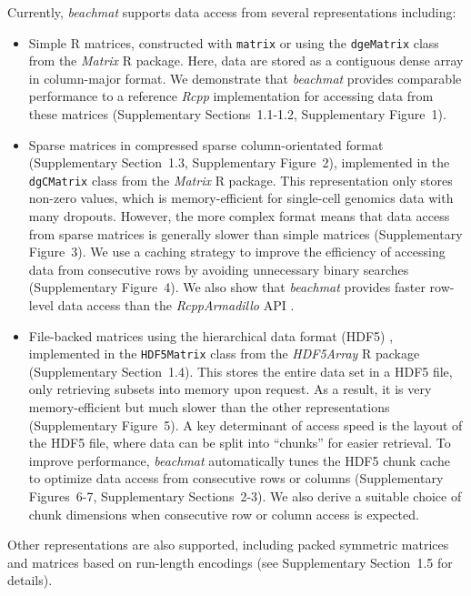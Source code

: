 \documentclass[10pt,letterpaper]{article}
\newcommand{\suppfigsimpleaccess}{1}
\newcommand{\suppfigsparseschem}{2}
\newcommand{\suppfigsparsecol}{3}
\newcommand{\suppfigsparserow}{4}
\newcommand{\suppfighdfspeed}{5}
\newcommand{\suppfighdflayout}{6-7}
\newcommand{\suppsecsimple}{1.1-1.2}
\newcommand{\suppsecsparse}{1.3}
\newcommand{\suppsechdfmat}{1.4}
\newcommand{\suppsecother}{1.5}
\newcommand{\suppseclayoutoptim}{2}
\newcommand{\suppseclayouttest}{3}
\newcommand{\beachmat}{\textit{beachmat}}
\begin{document}
Currently, \beachmat{} supports data access from several representations including:
\begin{itemize}
    \item Simple R matrices, constructed with \texttt{matrix} or using the \texttt{dgeMatrix} class from the \textit{Matrix} R package.
        Here, data are stored as a contiguous dense array in column-major format.
        We demonstrate that \beachmat{} provides comparable performance to a reference \textit{Rcpp} implementation for accessing data from these matrices 
        (Supplementary Sections~\suppsecsimple{}, Supplementary Figure~\suppfigsimpleaccess{}). 
    \item Sparse matrices in compressed sparse column-orientated format (Supplementary Section~\suppsecsparse{}, Supplementary Figure~\suppfigsparseschem{}), 
        implemented in the \texttt{dgCMatrix} class from the \textit{Matrix} R package.
        This representation only stores non-zero values, which is memory-efficient for single-cell genomics data with many dropouts.
        However, the more complex format means that data access from sparse matrices is generally slower than simple matrices (Supplementary Figure~\suppfigsparsecol{}).
        We use a caching strategy to improve the efficiency of accessing data from consecutive rows by avoiding unnecessary binary searches (Supplementary Figure~\suppfigsparserow{}).
        We also show that \beachmat{} provides faster row-level data access than the \textit{RcppArmadillo} API \cite{eddelbuettel2014arma}.
    \item File-backed matrices using the hierarchical data format (HDF5) \cite{hdf5}, 
        implemented in the \texttt{HDF5Matrix} class from the \textit{HDF5Array} R package (Supplementary Section~\suppsechdfmat{}).
        This stores the entire data set in a HDF5 file, only retrieving subsets into memory upon request.
        As a result, it is very memory-efficient but much slower than the other representations (Supplementary Figure~\suppfighdfspeed{}).
        A key determinant of access speed is the layout of the HDF5 file, where data can be split into ``chunks'' for easier retrieval.
        To improve performance, \beachmat{} automatically tunes the HDF5 chunk cache to optimize data access from consecutive rows or columns (Supplementary Figures~\suppfighdflayout{}, Supplementary Sections~\suppseclayoutoptim{}-\suppseclayouttest{}).
        We also derive a suitable choice of chunk dimensions when consecutive row or column access is expected.
\end{itemize}
Other representations are also supported, including packed symmetric matrices and matrices based on run-length encodings (see Supplementary Section~\suppsecother{} for details).
\end{document}

